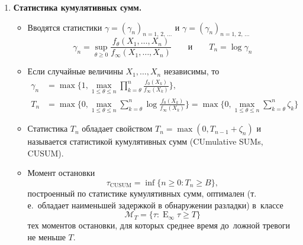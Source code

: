 \documentclass[a4paper,14pt]{extreport}
\renewcommand{\=}[1]{\stackrel{#1}{=}} %
\newcommand{\Expect}{\mathop{{}\mathrm{E}}}
\newcommand{\discretetime}{n = 1,\,2,\,\ldots}
\newcommand{\newprocessd}[1]{
    \ensuremath{
        #1 = \left(#1 _n\right)_{\discretetime}
    }
}
\newenvironment{boenumerate}
  {\begin{enumerate}\renewcommand\labelenumi{\textbf{\theenumi.}}}
  {\end{enumerate}}
\begin{document}
\begin{boenumerate}
    \item \textbf{Статистика кумулятивных сумм.}
    \begin{itemize}
    \item Вводятся статистики $\newprocessd{\gamma}$ 
     и $\newprocessd{\gamma}$ 
    \begin{equation*}
    \gamma_n = \sup\limits_{\theta \geqslant 0} \frac{f_{\theta}(X_1, \ldots, X_n)}{f_{\infty}(X_1, \ldots, X_n)}
    \qquad \mbox{и} \qquad T_n = \log \gamma_n
    \end{equation*}
    \item Если случайные величины
    $X_1, \ldots, X_n$ независимы, то
    \begin{align*}
    \gamma_n &= \max\Big\{1, \max\limits_{1 \leqslant \theta \leqslant n} \prod\limits_{k=\theta}^{n}
        \frac{f_{0}(X_k)}{f_{\infty}(X_k)} \Big\},\\
    T_n &= \max\Big\{0, \max\limits_{1 \leqslant \theta \leqslant n} \sum\limits_{k=\theta}^{n}
        \log \frac{f_{0}(X_k)}{f_{\infty}(X_k)} \Big\} = 
        \max\Big\{0, \max\limits_{1 \leqslant \theta \leqslant n} \sum\limits_{k=\theta}^{n}
        \zeta_k \Big\}
    \end{align*}
    \item Статистика $T_n$ обладает свойством $T_n = \max (0, T_{n-1} + \zeta_n)$
    и называется статистикой кумулятивных сумм (CUmulative SUMs, CUSUM).
    \item Момент остановки
    \[
    \tau_{\mathrm{CUSUM}} = \inf \{n \geqslant 0: T_n \geqslant B\},
    \]
    построенный по статистике кумулятивных сумм,
    оптимален (т.\,е.~обладает наименьшей задержкой
    в обнаружении разладки) в~классе
    \[
    \mathcal{M}_T = \{\tau : 
        {\textstyle \Expect_{\infty}} \tau \geqslant T\}
    \]
    тех моментов остановки, для которых среднее время
    до~ложной тревоги не меньше $T$.

    \end{itemize}



\end{boenumerate}
\end{document}
